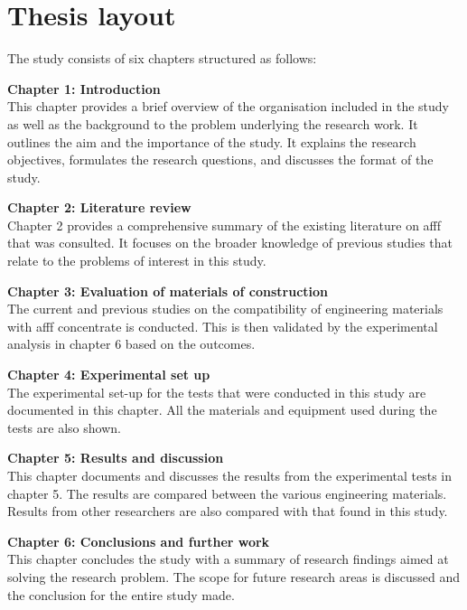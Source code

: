 \section{Thesis layout}
The study consists of six chapters structured as follows:

\noindent \textbf{Chapter 1: Introduction} \\ 
This chapter provides a brief overview of the organisation included in the study as well as the background to the problem underlying the research work. It outlines the aim and the importance of the study. It explains the research objectives, formulates the research questions, and discusses the format of the study.

\noindent \textbf{Chapter 2: Literature review} \\
Chapter 2 provides a comprehensive summary of the existing literature on \acrshort{afff} that was consulted. It focuses on the broader knowledge of previous studies that relate to the problems of interest in this study.

\noindent \textbf{Chapter 3: Evaluation of materials of construction} \\
The current and previous studies on the compatibility of engineering materials with \acrshort{afff} concentrate is conducted. This is then validated by the experimental analysis in chapter 6 based on the outcomes.

\noindent \textbf{Chapter 4: Experimental set up} \\
The experimental set-up for the tests that were conducted in this study are documented in this chapter. All the materials and equipment used during the tests are also shown.

\noindent \textbf{Chapter 5: Results and discussion} \\
This chapter documents and discusses the results from the experimental tests in chapter 5. The results are compared between the various engineering materials. Results from other researchers are also compared with that found in this study. 

\noindent \textbf{Chapter 6: Conclusions and further work} \\
This chapter concludes the study with a summary of research findings aimed at solving the
research problem. The scope for future research areas is discussed and the conclusion for the entire study made.
